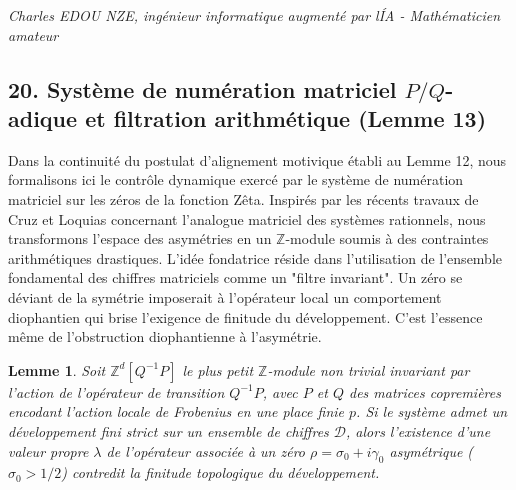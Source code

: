 \documentclass[
]{article}
\newtheorem{lemma}{Lemme}
\begin{document}
\vspace{1cm}
\begin{flushright}
\textit{Charles EDOU NZE, ingénieur informatique augmenté par l\'IA - Mathématicien amateur}
\end{flushright}

\subsection{20. Système de numération matriciel $P/Q$-adique et filtration arithmétique (Lemme 13)}
Dans la continuité du postulat d'alignement motivique établi au Lemme 12, nous formalisons ici le contrôle dynamique exercé par le système de numération matriciel sur les zéros de la fonction Zêta. Inspirés par les récents travaux de Cruz et Loquias concernant l'analogue matriciel des systèmes rationnels, nous transformons l'espace des asymétries en un $\mathbb{Z}$-module soumis à des contraintes arithmétiques drastiques. L'idée fondatrice réside dans l'utilisation de l'ensemble fondamental des chiffres matriciels comme un "filtre invariant". Un zéro se déviant de la symétrie imposerait à l'opérateur local un comportement diophantien qui brise l'exigence de finitude du développement. C'est l'essence même de l'obstruction diophantienne à l'asymétrie.

\begin{lemma}
Soit $\mathbb{Z}^d[Q^{-1}P]$ le plus petit $\mathbb{Z}$-module non trivial invariant par l'action de l'opérateur de transition $Q^{-1}P$, avec $P$ et $Q$ des matrices copremières encodant l'action locale de Frobenius en une place finie $p$. Si le système admet un développement fini strict sur un ensemble de chiffres $\mathcal{D}$, alors l'existence d'une valeur propre $\lambda$ de l'opérateur associée à un zéro $\rho = \sigma_0 + i\gamma_0$ asymétrique ($\sigma_0 > 1/2$) contredit la finitude topologique du développement.
\end{lemma}
\end{document}

